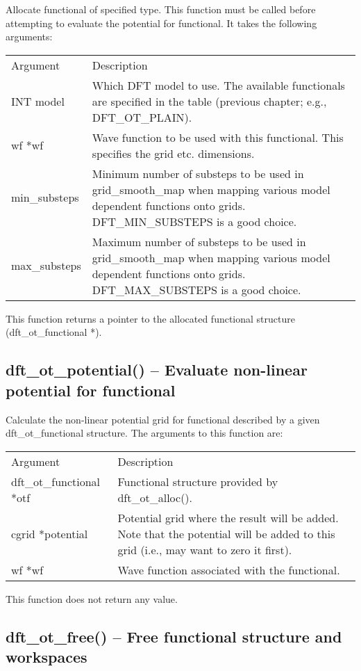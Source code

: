 \documentclass[12pt,letterpaper]{report}
\begin{document}
Allocate functional of specified type. This function must be called before attempting to evaluate the potential for functional. It takes the following arguments:
\begin{longtable}{p{} p{}}
Argument & Description\\
\cline{1-2}
INT model & Which DFT model to use. The available functionals are specified in the table (previous chapter; e.g., DFT\_OT\_PLAIN).\\
wf *wf & Wave function to be used with this functional. This specifies the grid etc. dimensions.\\
min\_substeps & Minimum number of substeps to be used in grid\_smooth\_map when mapping various model dependent functions onto grids. DFT\_MIN\_SUBSTEPS is a good choice.\\
max\_substeps & Maximum number of substeps to be used in grid\_smooth\_map when mapping various model dependent functions onto grids. DFT\_MAX\_SUBSTEPS is a good choice.\\
\end{longtable}
\noindent
This function returns a pointer to the allocated functional structure (dft\_ot\_functional *).

\subsection{dft\_ot\_potential() -- Evaluate non-linear potential for functional}

Calculate the non-linear potential grid for functional described by a given dft\_ot\_functional structure. The arguments to this function are:
\begin{longtable}{p{} p{}}
Argument & Description\\
\cline{1-2}
dft\_ot\_functional *otf & Functional structure provided by dft\_ot\_alloc().\\
cgrid *potential & Potential grid where the result will be added. Note that the potential will be added to this grid (i.e., may want to zero it first).\\
wf *wf & Wave function associated with the functional.\\                  
\end{longtable}
\noindent
This function does not return any value.

\subsection{dft\_ot\_free() -- Free functional structure and workspaces}
\end{document}
